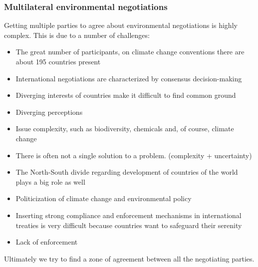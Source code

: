 \documentclass[../summary.tex]{subfiles}
\begin{document}
		\subsubsection{Multilateral environmental negotiations}
			Getting multiple parties to agree about environmental negotiations is highly complex. This is due to a number of challenges:
			\begin{itemize}
				\setlength{\itemsep}{0pt}
				\item The great number of participants, on climate change conventions there are about 195 countries present
				\item International negotiations are characterized by consensus decision-making
				\item Diverging interests of countries make it difficult to find common ground
				\item Diverging perceptions
				\item Issue complexity, such as biodiversity, chemicals and, of course, climate change
				\item There is often not a single solution to a problem. (complexity + uncertainty)
				\item The North-South divide regarding development of countries of the world plays a big role as well
				\item Politicization of climate change and environmental policy
				\item  Inserting strong compliance and enforcement mechanisms in international treaties is very difficult because countries want to safeguard their serenity
				\item Lack of enforcement 
			\end{itemize}
			Ultimately we try to find a zone of agreement between all the negotiating parties. \\
			
\end{document}
